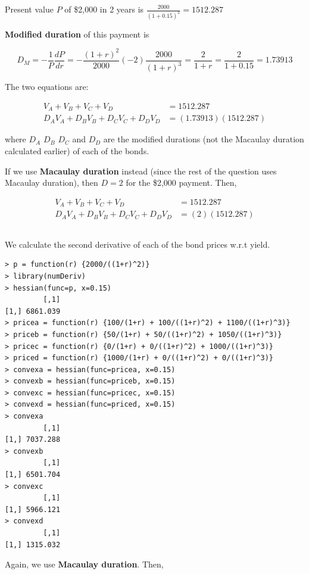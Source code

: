 \documentclass[11pt]{scrartcl}
\begin{document}
Present value $P$ of \$2,000 in 2 years is $\frac{2000}{(1+0.15)^2} = 1512.287$

\textbf{Modified duration} of this payment is

\[D_M = -\frac{1}{P}\frac{dP}{dr} = - \frac{(1+r)^2}{2000}(-2)\frac{2000}{(1+r)^3} = \frac{2}{1+r} = \frac{2}{1 + 0.15} = 1.73913\]

The two equations are:

\begin{align*}
V_A + V_B + V_C + V_D &= 1512.287 \\
D_A V_A + D_BV_B + D_CV_C + D_DV_D &= (1.73913)(1512.287)
\end{align*}

where $D_A$ $D_B$ $D_C$ and $D_D$ are the modified durations (not the Macaulay duration calculated earlier) of each of the bonds.

If we use \textbf{Macaulay duration} instead (since the rest of the question uses Macaulay duration), then $D = 2$ for the \$2,000 payment. Then,

\begin{align*}
V_A + V_B + V_C + V_D &= 1512.287 \\
D_A V_A + D_BV_B + D_CV_C + D_DV_D &= (2)(1512.287)
\end{align*}

\subsection{}

We calculate the second derivative of each of the bond prices w.r.t yield.

\begin{lstlisting}
> p = function(r) {2000/((1+r)^2)}
> library(numDeriv)
> hessian(func=p, x=0.15)
         [,1]
[1,] 6861.039
> pricea = function(r) {100/(1+r) + 100/((1+r)^2) + 1100/((1+r)^3)}
> priceb = function(r) {50/(1+r) + 50/((1+r)^2) + 1050/((1+r)^3)}
> pricec = function(r) {0/(1+r) + 0/((1+r)^2) + 1000/((1+r)^3)}
> priced = function(r) {1000/(1+r) + 0/((1+r)^2) + 0/((1+r)^3)}
> convexa = hessian(func=pricea, x=0.15)
> convexb = hessian(func=priceb, x=0.15)
> convexc = hessian(func=pricec, x=0.15)
> convexd = hessian(func=priced, x=0.15)
> convexa
         [,1]
[1,] 7037.288
> convexb
         [,1]
[1,] 6501.704
> convexc
         [,1]
[1,] 5966.121
> convexd
         [,1]
[1,] 1315.032
\end{lstlisting}

Again, we use \textbf{Macaulay duration}. Then,
\end{document}
